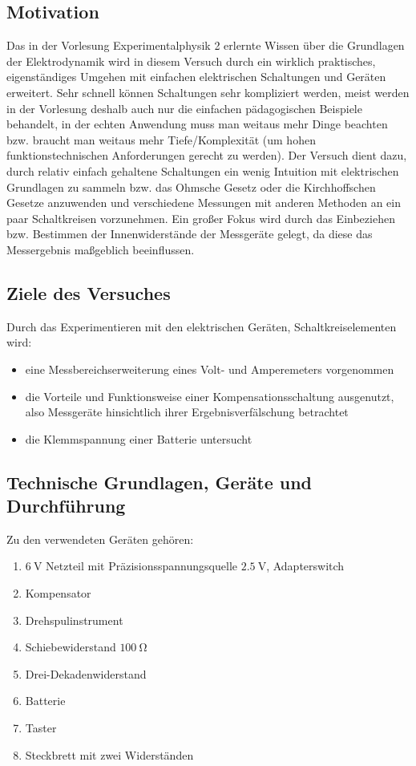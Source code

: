 \subsection{Motivation}
Das in der Vorlesung Experimentalphysik 2 erlernte Wissen über die Grundlagen der Elektrodynamik wird in diesem Versuch durch ein wirklich praktisches, eigenständiges Umgehen mit einfachen elektrischen Schaltungen und Geräten erweitert. Sehr schnell können Schaltungen sehr kompliziert werden, meist werden in der Vorlesung deshalb auch nur die einfachen pädagogischen Beispiele behandelt, in der echten Anwendung muss man weitaus mehr Dinge beachten bzw. braucht man weitaus mehr Tiefe/Komplexität (um hohen funktionstechnischen Anforderungen gerecht zu werden). Der Versuch dient dazu, durch relativ einfach gehaltene Schaltungen ein wenig Intuition mit elektrischen Grundlagen zu sammeln bzw. das Ohmsche Gesetz oder die Kirchhoffschen Gesetze anzuwenden und verschiedene Messungen mit anderen Methoden an ein paar Schaltkreisen vorzunehmen. Ein großer Fokus wird durch das Einbeziehen bzw. Bestimmen der Innenwiderstände der Messgeräte gelegt, da diese das Messergebnis maßgeblich beeinflussen.

\subsection{Ziele des Versuches}
Durch das Experimentieren mit den elektrischen Geräten, Schaltkreiselementen wird:
\begin{itemize}
    \item eine Messbereichserweiterung eines Volt- und Amperemeters vorgenommen
    \item die Vorteile und Funktionsweise einer Kompensationsschaltung ausgenutzt, also Messgeräte hinsichtlich ihrer Ergebnisverfälschung betrachtet
    \item die Klemmspannung einer Batterie untersucht
\end{itemize}

\subsection{Technische Grundlagen, Geräte und Durchführung}
Zu den verwendeten Geräten gehören:
\begin{enumerate}
    \item \(\qty{6}{\volt}\) Netzteil mit Präzisionsspannungsquelle \(\qty{2.5}{\volt}\), Adapterswitch
    \item Kompensator
    \item Drehspulinstrument 
    \item Schiebewiderstand \(\qty{100}{\ohm}\)
    \item Drei-Dekadenwiderstand
    \item Batterie
    \item Taster
    \item Steckbrett mit zwei Widerständen
\end{enumerate}
\newpage
{}

